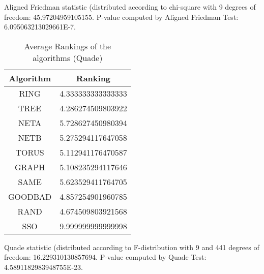 \documentclass[a4paper,10pt]{article}
\begin{document}
\begin{landscape}
Aligned Friedman statistic (distributed according to chi-square with 9 degrees of freedom: 45.97204959105155. 
P-value computed by Aligned Friedman Test: 6.095063213029661E-7.\newline


\newpage

\begin{table}[!htp]
\centering
\caption{Average Rankings of the algorithms (Quade)
}\begin{tabular}{c|c}
Algorithm&Ranking\\
\hline
 RING&4.333333333333333\\
 TREE&4.286274509803922\\
 NETA&5.728627450980394\\
 NETB&5.275294117647058\\
 TORUS&5.112941176470587\\
 GRAPH&5.108235294117646\\
 SAME&5.623529411764705\\
 GOODBAD&4.857254901960785\\
 RAND&4.674509803921568\\
 SSO&9.999999999999998\\
\end{tabular}
\end{table}
Quade statistic (distributed according to F-distribution with 9 and 441 degrees of freedom: 16.229310130857694. 
P-value computed by Quade Test: 4.5891182983948755E-23.\newline


\newpage


\end{landscape}
\end{document}
